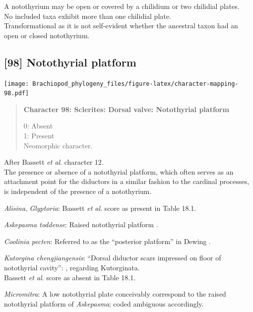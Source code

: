 \documentclass[openany]{book}
\begin{document}
A notothyrium may be open or covered by a chilidium or two chilidial
plates.\\
No included taxa exhibit more than one chilidial plate.\\
Transformational as it is not self-evident whether the ancestral taxon
had an open or closed notothyrium.

\subsection*{{[}98{]} Notothyrial platform}\label{notothyrial-platform}

\texttt{[image: Brachiopod\_phylogeny\_files/figure-latex/character-mapping-98.pdf]}

\begin{quote}
\textbf{Character 98: Sclerites: Dorsal valve: Notothyrial platform}

0: Absent\\
1: Present\\
Neomorphic character.
\end{quote}

After Bassett \emph{et al}.
\citeyearpar{Bassett2001Functionalmorphology} character 12.\\
The presence or absence of a notothyrial platform, which often serves as
an attachment point for the diductors in a similar fashion to the
cardinal processes, is independent of the presence of a notothyrium.

\hypertarget{Alisina-coding-98}{}
\emph{Alisina}, \emph{Glyptoria}: Bassett \emph{et al}.
\citeyearpar{Bassett2001Functionalmorphology} score as present in Table
18.1.

\hypertarget{Askepasma_toddense-coding-98}{}
\emph{Askepasma toddense}: Raised notothyrial platform
\citep{Williams1998Thediversity}.

\hypertarget{Coolinia_pecten-coding-98}{}
\emph{Coolinia pecten}: Referred to as the ``posterior platform'' in
Dewing \citeyearpar{Dewing2001Hingemodifications}.

\hypertarget{Kutorgina_chengjiangensis-coding-98}{}
\emph{Kutorgina chengjiangensis}: ``Dorsal diductor scars impressed on
floor of notothyrial cavity'':
\citet{Williams2000LinguliformeaCraniiformea}, regarding Kutorginata.\\
Bassett \emph{et al}. \citeyearpar{Bassett2001Functionalmorphology}
score as absent in Table 18.1.

\hypertarget{Micromitra-coding-98}{}
\emph{Micromitra}: A low notothyrial plate
\citep{Williams1998Thediversity} conceivably correspond to the raised
notothyrial platform of \emph{Askepasma}; coded ambiguous accordingly.
\end{document}
